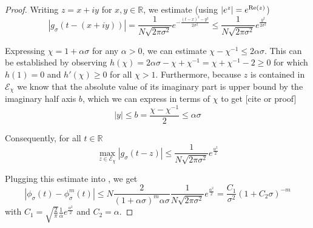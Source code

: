 \begin{proof}
    Writing $z = x + iy$ for $x,y \in \mathbb{R}$, we estimate (using $|e^z| = e^{\operatorname{Re}(z)}$)
    \begin{equation}
        |g_{\sigma}(t - (x + iy))| %
        = \frac{1}{N \sqrt{2 \pi \sigma^2}} e^{- \frac{(t - x)^2 - y^2}{2 \sigma^2}}
        \leq \frac{1}{N \sqrt{2 \pi \sigma^2}} e^{\frac{y^2}{2 \sigma^2}}
    \end{equation}

    Expressing $\chi = 1 + \alpha \sigma$ for any $\alpha > 0$,
    we can estimate $\chi - \chi^{-1} \leq 2\alpha\sigma$.
    This can be established by observing
    $h(\chi) = 2\alpha\sigma - \chi + \chi^{-1} = \chi + \chi^{-1} - 2 \geq 0$
    for which $h(1) = 0$ and $h'(\chi) \geq 0$ for all $\chi > 1$.
    Furthermore, because $z$ is
    contained in $\mathcal{E}_{\chi}$ we know that the absolute value of its
    imaginary part is upper bound by the imaginary half axis $b$, which we can
    express in terms of $\chi$ to get [cite or proof]
    \begin{equation}
        |y| \leq b = \frac{\chi - \chi^{-1}}{2} \leq \alpha\sigma
    \end{equation}

    Consequently, for all $t \in \mathbb{R}$
    \begin{equation}
        \max_{z \in \mathcal{E}_{\chi}} |g_{\sigma}(t - z)| 
        \leq \frac{1}{N \sqrt{2 \pi \sigma^2}} e^{\frac{\alpha^2}{2}}
    \end{equation}

    Plugging this estimate into , we get
    \begin{equation}
        \left| \phi_{\sigma}(t) - \phi_{\sigma}^m(t) \right|
        \leq N \frac{2}{(1 + \alpha\sigma)^m\alpha \sigma} \frac{1}{N \sqrt{2 \pi \sigma^2}} e^{\frac{\alpha^2}{2}}
        = \frac{C_1}{\sigma^2} (1 + C_2 \sigma)^{-m}
    \end{equation}
    with $C_1=\sqrt{\frac{2}{\pi}}\frac{1}{\alpha}e^{\frac{\alpha^2}{2}}$ and $C_2=\alpha$.
\end{proof}


